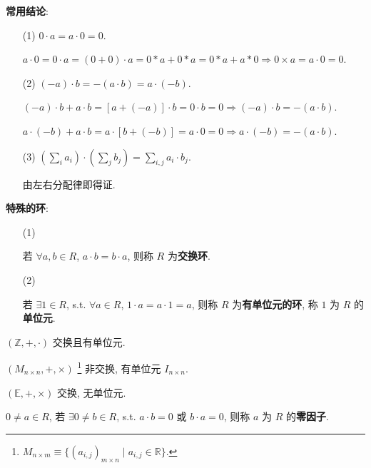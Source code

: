 \documentclass{note}
\begin{document}
\textbf{常用结论}:
\begin{itemize}
    \item[(1)] $0\cdot a=a\cdot 0=0$.
    \begin{pf}
        $a\cdot 0=0\cdot a=(0+0)\cdot a=0*a+0*a=0*a+a*0\Longrightarrow 0\times a=a\cdot 0=0$.
    \end{pf}
    \item[(2)] $(-a)\cdot b=-(a\cdot b)=a\cdot(-b)$.
    \begin{pf}
        $(-a)\cdot b+a\cdot b=[a+(-a)]\cdot b=0\cdot b=0\Longrightarrow (-a)\cdot b=-(a\cdot b)$.

        $a\cdot(-b)+a\cdot b=a\cdot[b+(-b)]=a\cdot 0=0\Longrightarrow a\cdot(-b)=-(a\cdot b)$.
    \end{pf}
    \item[(3)] $\left(\sum_ia_i\right)\cdot\left(\sum_jb_j\right)=\sum_{i,j}a_i\cdot b_j$.
    \begin{pf}
        由左右分配律即得证.
    \end{pf}
\end{itemize}

\textbf{特殊的环}:
\begin{itemize}
    \item[(1)] ~\begin{df}[交换环]
        若 $\forall a,b\in R$, $a\cdot b=b\cdot a$, 则称 $R$ 为\textbf{交换环}.
    \end{df}
    \item[(2)] ~\begin{df}[有单位元的环]
        若 $\exists 1\in R$, s.t. $\forall a\in R$, $1\cdot a=a\cdot 1=a$, 则称 $R$ 为\textbf{有单位元的环}, 称 $1$ 为 $R$ 的\textbf{单位元}.
    \end{df}
\end{itemize}

\begin{eg}
    $(\mathbb{Z},+,\cdot)$ 交换且有单位元.
\end{eg}

\begin{eg}
    $(M_{n\times n},+,\times)$ \footnote{$M_{n\times m}\equiv\{(a_{i,j})_{m\times n}\mid a_{i,j}\in\mathbb{R}\}$.} 非交换, 有单位元 $I_{n\times n}$.
\end{eg}

\begin{eg}
    $(\mathbb{E},+,\times)$ 交换, 无单位元.
\end{eg}

\begin{df}[零因子]
    $0\neq a\in R$, 若 $\exists 0\neq b\in R$, s.t. $a\cdot b=0$ 或 $b\cdot a=0$, 则称 $a$ 为 $R$ 的\textbf{零因子}.
\end{df}
\end{document}
